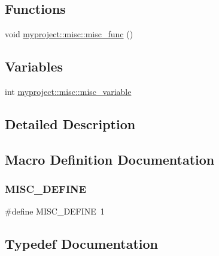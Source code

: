 \subsection*{Functions}
\begin{DoxyCompactItemize}
\item 
void \hyperlink{group__group__misc_gaaa4821583880ea9cbde9a6e60d45b653}{myproject\+::misc\+::misc\+\_\+func} ()
\end{DoxyCompactItemize}
\subsection*{Variables}
\begin{DoxyCompactItemize}
\item 
int \hyperlink{group__group__misc_gae3b777196b0b2a533b53782b85317144}{myproject\+::misc\+::misc\+\_\+variable}
\end{DoxyCompactItemize}


\subsection{Detailed Description}


\subsection{Macro Definition Documentation}
\mbox{\label{group__group__misc_gaffc55897a14b87621002abc7a654369c}} 
\subsubsection{\texorpdfstring{M\+I\+S\+C\+\_\+\+D\+E\+F\+I\+NE}{MISC\_DEFINE}}
{\footnotesize\ttfamily \#define M\+I\+S\+C\+\_\+\+D\+E\+F\+I\+NE~1}



\subsection{Typedef Documentation}
\mbox{\label{group__group__misc_gad226919cbe86fe93d4f5a89f25b1e4d8}} 

